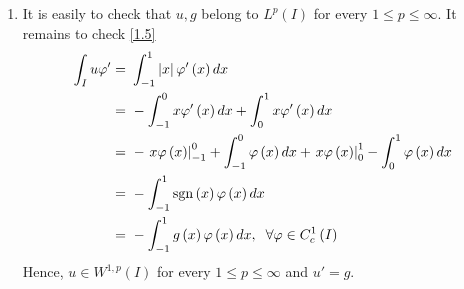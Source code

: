 \documentclass[a4paper,oneside]{book}
\numberwithin{equation}{chapter}
\begin{document}
\begin{enumerate}
\item It is easily to check that $u,g$ belong to $L^p\left(I\right)$ for every $1\le p\le \infty$. It remains to check \eqref{1.5}
\begin{align}
\int_I {u\varphi '}  =&\ \int_{ - 1}^1 {\left| x \right|\varphi '\left( x \right)dx} \\
 =&\  - \int_{ - 1}^0 {x\varphi '\left( x \right)dx}  + \int_0^1 {x\varphi '\left( x \right)dx} \\
 =&\  - \left. {x\varphi \left( x \right)} \right|_{ - 1}^0 + \int_{ - 1}^0 {\varphi \left( x \right)dx}  + \left. {x\varphi \left( x \right)} \right|_0^1 - \int_0^1 {\varphi \left( x \right)dx} \\
 =&\  - \int_{ - 1}^1 {{\mathop{\rm sgn}} \left( x \right)\varphi \left( x \right)dx} \\
 =&\  - \int_{ - 1}^1 {g\left( x \right)\varphi \left( x \right)dx} ,\hspace{0.2cm}\forall \varphi  \in C_c^1\left( I \right)
\end{align}
Hence, $u \in {W^{1,p}}\left( I \right)$ for every $1\le p\le \infty$ and $u'=g$.


\end{enumerate}
\end{document}
